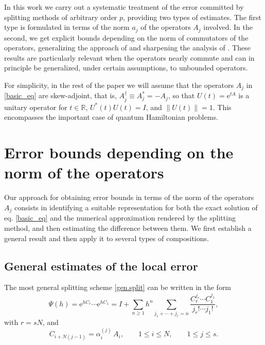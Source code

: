 \documentclass[11pt]{article}
\newcommand{\e}{\ensuremath{\mathrm{e}}}
\newcommand{\blue}[1]{{\color{blue} #1}}
\begin{document}
In this work we carry out a systematic treatment of the error committed by splitting methods of arbitrary order $p$, providing two types of estimates.
The first type is formulated in terms of the norm $a_j$ of the operators $A_j$ involved. 
In the second, we get explicit bounds depending on the norm of commutators
of the operators, generalizing the approach of  \cite{iserles24aea} and sharpening the analysis of \cite{childs21tot}. These results are
particularly relevant when the operators nearly commute and can in principle be generalized, under certain assumptions, to unbounded operators.

For simplicity, in the rest of the paper we will assume that the operators $A_j$ in \eqref{basic_eq} are skew-adjoint, that is, $A_j^{\dagger} \equiv A_j^*
= -A_j$, so that 
$U(t) = \e^{t A}$ is a unitary operator for $t \in \mathbb{R}$, $U^{*}(t) U(t) = I$, and $\|U(t)\| = 1$. This encompasses the important case
of quantum Hamiltonian problems.

\section{Error bounds depending on the norm of the operators}
\label{sec.2}

Our approach for obtaining error bounds in terms of the norm of the operators $A_j$ consists in identifying a suitable representation for both the exact solution of eq. \eqref{basic_eq}
and the numerical approximation  rendered by the splitting method,
and then estimating the difference between them. We first establish a general result and then apply it to several
types of compositions.



\subsection{General estimates of the local error}

The most general splitting scheme \eqref{gen.split} can be written in the form
\begin{equation}
\label{eq:expB}
\Psi(h) = \mathrm{e}^{h C_r} \cdots \mathrm{e}^{h C_1} = I + \sum_{n \geq 1} h^n \sum_{j_1+\cdots+j_r = n} \frac{C_r^{j_r} \cdots C_1^{j_1}}{j_r! \cdots j_1!},
\end{equation}
with $r= s N$, and
\[
C_{i + N (j-1)} = \alpha_i^{(j)} \, A_i, \qquad 1\leq i \leq N, \qquad 1\leq j \leq s.
\] 
\end{document}
